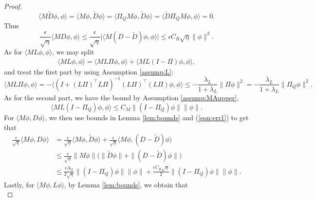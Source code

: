 \documentclass[10pt,a4paper]{amsart}
\begin{document}
\begin{proof}
\begin{equation}
   \langle M \tilde{D}\phi, \phi \rangle = \langle M\phi, \tilde{D}\phi\rangle = \langle \Pi_Q M\phi, \tilde{D}\phi\rangle=\langle \tilde{D} \Pi_Q M\phi, \phi\rangle = 0.
\end{equation}
Thus
\begin{equation}
    \frac{\epsilon}{\sqrt{\eta}}\langle MD\phi, \phi\rangle\leq \frac{\epsilon}{\sqrt{\eta}}\big|\langle M(D-\tilde{D})\phi, \phi\rangle\big|\leq \epsilon C_R\sqrt{\eta}\|\phi\|^2.
\end{equation}
As for $\langle M L\phi, \phi\rangle$, we may split
\begin{equation}
    \begin{aligned}
        \langle M L\phi, \phi\rangle = \langle M L\Pi\phi, \phi\rangle+ \langle M L(I-\Pi)\phi, \phi\rangle,
    \end{aligned}
\end{equation}
and treat the first part by using Assumption \ref{assump:L}:
\begin{equation}
    \langle M L\Pi\phi, \phi\rangle = -\langle( I+(L\Pi)^{\top} L\Pi)^{-1}(L\Pi)^{\top}(L\Pi)\phi, \phi\rangle \leq -\frac{\lambda_L}{1+\lambda_L} \|\Pi\phi\|^2 = -\frac{\lambda_L}{1+\lambda_L} \|\Pi_Q\phi\|^2.
\end{equation}
As for the second part, we have the bound  by  Assumption \ref{assump:MAupper},
\begin{equation}
     \langle M L(I-\Pi_Q)\phi, \phi\rangle\leq C_M \|(I-\Pi_Q)\phi\|\|\phi\|.
\end{equation}
For $\langle M\phi, D\phi\rangle$, we then use bounds in Lemma \ref{lem:bounds} and (\ref{eqn:err1}) to get that
\begin{equation}
\begin{aligned}
   \frac{\epsilon}{\sqrt{\eta}} \langle M\phi, D\phi\rangle&=\frac{\epsilon}{\sqrt{\eta}} \langle M\phi, \tilde{D}\phi\rangle+\frac{\epsilon}{\sqrt{\eta}} \langle M\phi, (D-\tilde{D})\phi\rangle\\
   &\leq \frac{\epsilon}{\sqrt{\eta}}\|M\phi\|\Big(\|\tilde{D}\phi\|+\|(D-\tilde{D})\phi\|\Big) \\
   &\leq \frac{\epsilon\Lambda_Q}{2\sqrt{\eta}}\|(I-\Pi_Q)\phi\|\|\phi\| + \frac{\epsilon C_R\sqrt{\eta}}{2} \|(I-\Pi_Q)\phi\| \|\phi\|.
\end{aligned}
\end{equation}
Lastly,  for $\langle M\phi, L \phi\rangle$, by Lemma \ref{lem:bounds}, we obtain that
\begin{equation}

\end{equation}
\end{proof}
\end{document}

